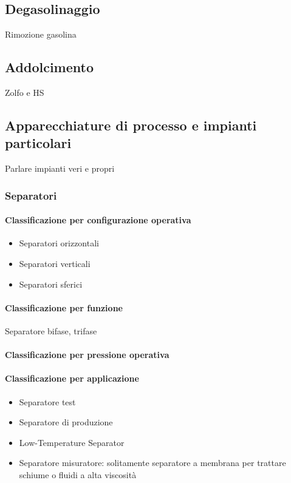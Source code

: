 \subsection{Degasolinaggio}
Rimozione gasolina

\subsection{Addolcimento}
Zolfo e HS

\subsection{Apparecchiature di processo e impianti particolari}
Parlare impianti veri e propri

\subsubsection{Separatori}
\paragraph{Classificazione per configurazione operativa}
\begin{itemize}
\item Separatori orizzontali
\item Separatori verticali
\item Separatori sferici
\end{itemize}

\paragraph{Classificazione per funzione}
Separatore bifase, trifase
\paragraph{Classificazione per pressione operativa}
\paragraph{Classificazione per applicazione}
\begin{itemize}
\item Separatore test
\item Separatore di produzione
\item Low-Temperature Separator
\item Separatore misuratore: solitamente separatore a membrana per trattare schiume o fluidi a alta viscosità
\end{itemize}


